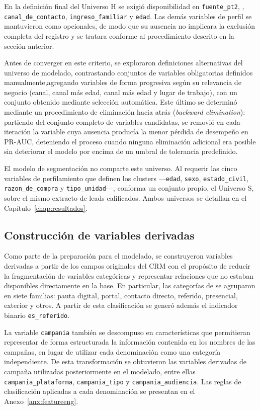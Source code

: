 En la definición final del Universo H se exigió disponibilidad en \texttt{fuente\_pt2}, , \texttt{canal\_de\_contacto}, \texttt{ingreso\_familiar} y \texttt{edad}. Las demás variables de perfil se mantuvieron como opcionales, de modo que su ausencia no implicara la exclusión completa del registro y se tratara conforme al procedimiento descrito en la sección anterior.

Antes de converger en este criterio, se exploraron definiciones alternativas del universo de modelado, contrastando conjuntos de variables obligatorias definidos manualmente,agregando variables de forma progresiva según su relevancia de negocio (canal, canal más edad, canal más edad y lugar de trabajo), con un conjunto obtenido mediante selección automática. Este último se determinó mediante un procedimiento de eliminación hacia atrás (\textit{backward elimination}): partiendo del conjunto completo de variables candidatas, se removió en cada iteración la variable cuya ausencia producía la menor pérdida de desempeño en PR-AUC, deteniendo el proceso cuando ninguna eliminación adicional era posible sin deteriorar el modelo por encima de un umbral de tolerancia predefinido. 

El modelo de segmentación no comparte este universo. Al requerir las cinco variables de perfilamiento que definen los clusters —\texttt{edad}, \texttt{sexo}, \texttt{estado\_civil}, \texttt{razon\_de\_compra} y \texttt{tipo\_unidad}—, conforma un conjunto propio, el Universo S, sobre el mismo extracto de leads calificados. Ambos universos se detallan en el Capítulo~\ref{chap:resultados}.

\subsection{Construcción de variables derivadas}
\label{sec:met-feature-engineering}

Como parte de la preparación para el modelado, se construyeron variables derivadas a partir de los campos originales del CRM con el propósito de reducir la fragmentación de variables categóricas y representar relaciones que no estaban disponibles directamente en la base. En particular, las categorías de  se agruparon en siete familias: pauta digital, portal, contacto directo, referido, presencial, exterior y otros. A partir de esta clasificación se generó además el indicador binario \texttt{es\_referido}.

La variable \texttt{campania} también se descompuso en características que permitieran representar de forma estructurada la información contenida en los nombres de las campañas, en lugar de utilizar cada denominación como una categoría independiente. De esta transformación se obtuvieron las variables derivadas de campaña utilizadas posteriormente en el modelado, entre ellas \texttt{campania\_plataforma}, \texttt{campania\_tipo} y \texttt{campania\_audiencia}. Las reglas de clasificación aplicadas a cada denominación se presentan en el Anexo~\ref{anx:featureeng}.

